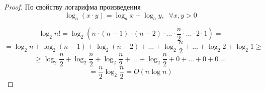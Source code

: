 \begin{proof}
        
По свойству логарифма произведения 
$$\log_a{(x\cdot y)} = \log_a{x} + \log_a{y}, \;\;\forall x, y > 0$$

$$ \log_2{n!} = \log_2{(n\cdot (n-1)\cdot (n-2) \cdot \ldots \cdot \frac{n}{2} \cdot \ldots \cdot 2 \cdot 1)} = $$
$$   = \log_2{n} + \log_2{(n-1)}+ \log_2{(n-2)} + \ldots + \log_2{\frac{n}{2}} +\ldots + \log_2{2} + \log_2{1}  \geqslant $$
$$   \geqslant  \log_2{\frac{n}{2}} + \log_2{\frac{n}{2}}+ \log_2{\frac{n}{2}} + \ldots + \log_2{\frac{n}{2}} + 0 + \ldots + 0 + 0 = $$
$$ = \frac{n}{2} \log_2{\frac{n}{2}} = O (n \log n)$$

\end{proof}

